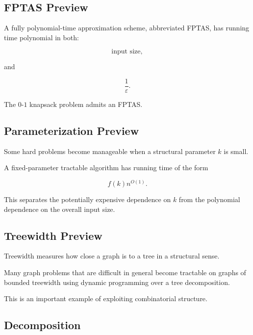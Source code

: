 \subsection{FPTAS Preview}
\label{subsec:fptas-preview}

A fully polynomial-time approximation scheme, abbreviated FPTAS, has
running time polynomial in both:

\[
\boxed{
\text{input size},
}
\]

and

\[
\boxed{
\frac1\varepsilon.
}
\]

The \(0\)-\(1\) knapsack problem admits an FPTAS.

\subsection{Parameterization Preview}
\label{subsec:parameterized-complexity-preview}

Some hard problems become manageable when a structural parameter \(k\) is
small.

A fixed-parameter tractable algorithm has running time of the form

\[
\boxed{
f(k)n^{O(1)}.
}
\]

This separates the potentially expensive dependence on \(k\) from the
polynomial dependence on the overall input size.

\subsection{Treewidth Preview}
\label{subsec:treewidth-preview}

Treewidth measures how close a graph is to a tree in a structural sense.

Many graph problems that are difficult in general become tractable on
graphs of bounded treewidth using dynamic programming over a tree
decomposition.

This is an important example of exploiting combinatorial structure.

\subsection{Decomposition}
\label{subsec:combinatorial-decomposition}

